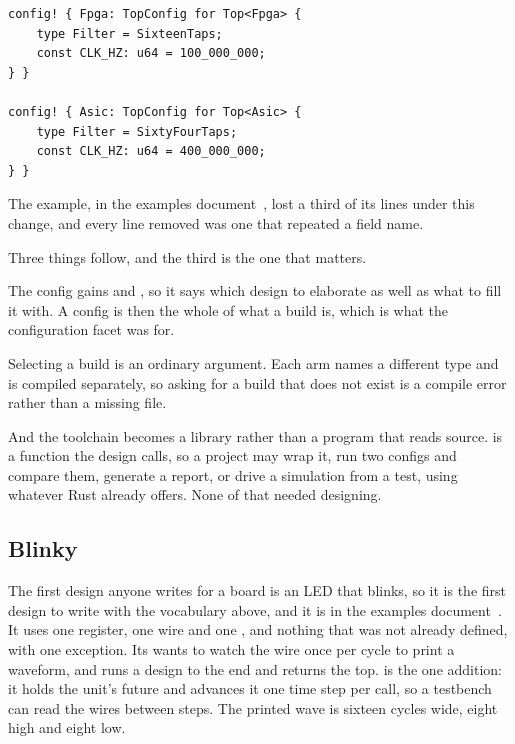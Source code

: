 \begin{lstlisting}[caption={A build is one item. The body is spliced into the design's own configuration impl unchanged, so the macro never parses it.},label={lst:config-macro}]
config! { Fpga: TopConfig for Top<Fpga> {
    type Filter = SixteenTaps;
    const CLK_HZ: u64 = 100_000_000;
} }

config! { Asic: TopConfig for Top<Asic> {
    type Filter = SixtyFourTaps;
    const CLK_HZ: u64 = 400_000_000;
} }
\end{lstlisting}

The example,  in the examples
document~\cite{examples}, lost a third of its lines under this change,
and every line removed was one that repeated a field name.

Three things follow, and the third is the one that matters.

The config gains  and , so it says which
design to elaborate as well as what to fill it with. A config is then the
whole of what a build is, which is what the configuration facet was for.

Selecting a build is an ordinary argument. Each arm names a different type
and is compiled separately, so asking for a build that does not exist is a
compile error rather than a missing file.

And the toolchain becomes a library rather than a program that reads
source.  is a function the design calls, so a project may
wrap it, run two configs and compare them, generate a report, or drive a
simulation from a test, using whatever Rust already offers. None of that
needed designing.

\subsection{Blinky}

The first design anyone writes for a board is an LED that blinks, so it
is the first design to write with the vocabulary above, and it is
 in the examples document~\cite{examples}. It uses
one register, one wire and one , and nothing that was not
already defined, with one exception. Its  wants to watch the
wire once per cycle to print a waveform, and  runs a
design to the end and returns the top.  is the one
addition: it holds the unit's future and advances it one time step per
call, so a testbench can read the wires between steps. The printed wave
is sixteen cycles wide, eight high and eight low.

